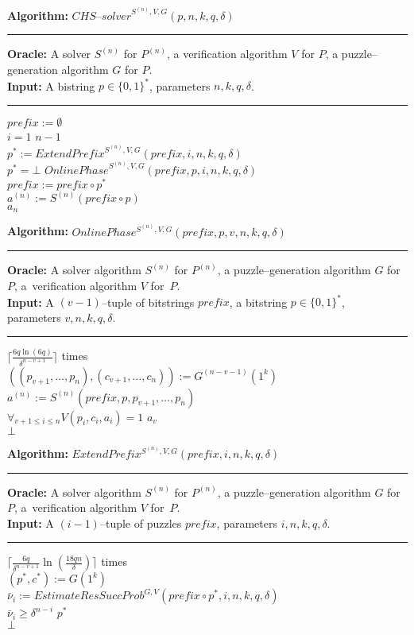 \begin{codeblock}
  \textbf{Algorithm:} $\mathit{CHS\text{--}solver}^{S^{(n)},V,G}(p, n, k, q, \delta)$
  \medskip\hrule
  \textbf{Oracle:} A solver $S^{(n)}$ for $P^{(n)}$, a verification algorithm $V$ for $P$, a puzzle--generation algorithm $G$ for $P$.\\
  \textbf{Input:}  A bistring $p \in \{0,1\}^{*}$, parameters $n, k, q, \delta$.
  \medskip\hrule
  $\mathit{prefix} := \emptyset$\\
  \For $i = 1$ \To $n-1$ \Do \\
  \IndI $p^* := \mathit{ExtendPrefix}^{S^{(n)}, V, G}(\mathit{prefix}, i, n, k, q, \delta)$\\
  \IndI \If $p^* = \bot$ \Then \Return $\mathit{OnlinePhase}^{S^{(n)}, V, G}(\mathit{prefix}, p, i, n, k, q, \delta)$ \\
  \IndI \Else $\mathit{prefix} := \mathit{prefix} \circ p^*$\\
  $ a^{(n)} := S^{(n)}(\mathit{prefix} \circ p)$ \\
  \Return $a_n$
\end{codeblock}
%
\begin{codeblock}
  \textbf{Algorithm:} $\mathit{OnlinePhase^{S^{(n)}, V, G}(\mathit{prefix}, p, v, n, k, q, \delta)}$
  \medskip \hrule
  \textbf{Oracle:} A solver algorithm $S^{(n)}$ for $P^{(n)}$, a puzzle--generation algorithm $G$ for $P$, a~verification algorithm $V$ for~$P$.\\
  \textbf{Input:} A $(v-1)$--tuple of bitstrings $\mathit{prefix}$, a bitstring $p \in \{0,1\}^{*}$, \\ parameters $v, n, k, q, \delta$.
  \medskip\hrule
  \Repeat $\Big\lceil\frac{6q \ln (6q)}{\delta^{n-v+1}}\Big\rceil$ times \\
  \IndI $((p_{v+1}, \dotsc, p_{n}),(c_{v+1}, \dots, c_n)) := G^{(n-v-1)}(1^k)$\\
  \IndI $a^{(n)} := S^{(n)}(\mathit{prefix}, p, p_{v+1}, \dotsc, p_n)$\\
  \IndI \If $\forall_{v+1 \leq i \leq n} V(p_i, c_i, a_i) = 1$ \Then \Return $a_v$\\
  \Return $\bot$
\end{codeblock}
%
\begin{codeblock}
  \textbf{Algorithm:} $\mathit{ExtendPrefix^{S^{(n)}, V, G}(prefix, i, n, k, q, \delta)}$
  \medskip \hrule
  \textbf{Oracle:} A solver algorithm $S^{(n)}$ for $P^{(n)}$, a puzzle--generation algorithm $G$ for $P$, a~verification algorithm $V$ for~$P$.\\
  \textbf{Input:} A $(i-1)$--tuple of puzzles $\mathit{prefix}$, parameters $i, n, k, q, \delta$.
  \medskip\hrule
  \Repeat $\Big\lceil \frac{6q}{\delta^{n-v+1}} \ln (\frac{18qn}{\delta}) \Big\rceil$ times \Do \\
  \IndI $(p^*, c^*) := G(1^k) $\\
  \IndI $\bar{\nu}_i := \mathit{EstimateResSuccProb}^{G,V}(\mathit{prefix} \circ p^*, i, n, k, q, \delta)$\\
  \IndI \If $\bar{\nu}_i \geq \delta^{n-i}$ \Then \Return $p^*$ \\
  \Return $\bot$
\end{codeblock}
